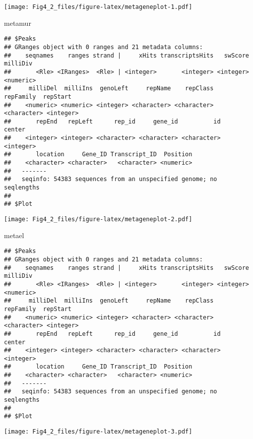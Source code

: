 \documentclass[
]{article}
\newenvironment{Shaded}{\begin{snugshade}}{\end{snugshade}}
\newcommand{\NormalTok}[1]{#1}
\begin{document}
\texttt{[image: Fig4\_2\_files/figure-latex/metageneplot-1.pdf]}

\begin{Shaded}
\begin{Highlighting}[]
\NormalTok{metamur}
\end{Highlighting}
\end{Shaded}

\begin{verbatim}
## $Peaks
## GRanges object with 0 ranges and 21 metadata columns:
##    seqnames    ranges strand |     xHits transcriptsHits   swScore  milliDiv
##       <Rle> <IRanges>  <Rle> | <integer>       <integer> <integer> <numeric>
##     milliDel  milliIns  genoLeft     repName    repClass   repFamily  repStart
##    <numeric> <numeric> <integer> <character> <character> <character> <integer>
##       repEnd   repLeft      rep_id     gene_id          id    center
##    <integer> <integer> <character> <character> <character> <integer>
##       location     Gene_ID Transcript_ID  Position
##    <character> <character>   <character> <numeric>
##   -------
##   seqinfo: 54383 sequences from an unspecified genome; no seqlengths
## 
## $Plot
\end{verbatim}

\texttt{[image: Fig4\_2\_files/figure-latex/metageneplot-2.pdf]}

\begin{Shaded}
\begin{Highlighting}[]
\NormalTok{metael}
\end{Highlighting}
\end{Shaded}

\begin{verbatim}
## $Peaks
## GRanges object with 0 ranges and 21 metadata columns:
##    seqnames    ranges strand |     xHits transcriptsHits   swScore  milliDiv
##       <Rle> <IRanges>  <Rle> | <integer>       <integer> <integer> <numeric>
##     milliDel  milliIns  genoLeft     repName    repClass   repFamily  repStart
##    <numeric> <numeric> <integer> <character> <character> <character> <integer>
##       repEnd   repLeft      rep_id     gene_id          id    center
##    <integer> <integer> <character> <character> <character> <integer>
##       location     Gene_ID Transcript_ID  Position
##    <character> <character>   <character> <numeric>
##   -------
##   seqinfo: 54383 sequences from an unspecified genome; no seqlengths
## 
## $Plot
\end{verbatim}

\texttt{[image: Fig4\_2\_files/figure-latex/metageneplot-3.pdf]}
\end{document}
